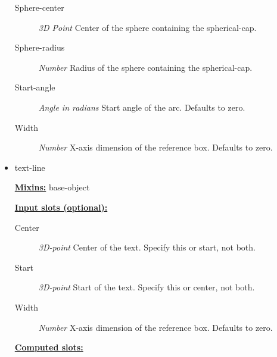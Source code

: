\documentclass [11pt]{book}
\begin{document}
\begin{itemize}
\begin{description}
\item [Sphere-center]
\emph{3D Point} Center of the sphere containing the spherical-cap.


\item [Sphere-radius]
\emph{Number} Radius of the sphere containing the spherical-cap.


\item [Start-angle]
\emph{Angle in radians} Start angle of the arc. Defaults to zero.


\item [Width]
\emph{Number} X-axis dimension of the reference box. Defaults to zero.


\end{description}







\item {}text-line


\textbf{
\underline{Mixins:}} base-object





\begin{description}

\end{description}








\textbf{
\underline{Input slots (optional):}}

\begin{description}

\item [Center]
\emph{3D-point} Center of the text. Specify this or start, not both.


\item [Start]
\emph{3D-point} Start of the text. Specify this or center, not both.


\item [Width]
\emph{Number} X-axis dimension of the reference box. Defaults to zero.


\end{description}






\textbf{
\underline{Computed slots:}}


\end{itemize}
\end{document}
